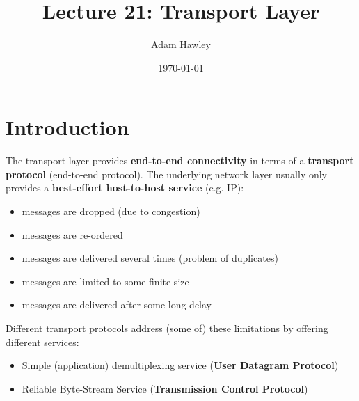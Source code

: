 \documentclass[11pt]{article}
\author{Adam Hawley}
\date{\today}
\title{Lecture 21: Transport Layer}
\begin{document}
\maketitle
\tableofcontents


\section{Introduction}
\label{sec:orgb58c24f}
The transport layer provides \textbf{end-to-end connectivity} in terms of a \textbf{transport protocol} (end-to-end protocol).
The underlying network layer usually only provides a \textbf{best-effort host-to-host service} (e.g. IP):
\begin{itemize}
\item messages are dropped (due to congestion)
\item messages are re-ordered
\item messages are delivered several times (problem of duplicates)
\item messages are limited to some finite size
\item messages are delivered after some long delay
\end{itemize}
Different transport protocols address (some of) these limitations by offering different services:
\begin{itemize}
\item Simple (application) demultiplexing service (\textbf{User Datagram Protocol})
\item Reliable Byte-Stream Service (\textbf{Transmission Control Protocol})
\end{itemize}
\end{document}
